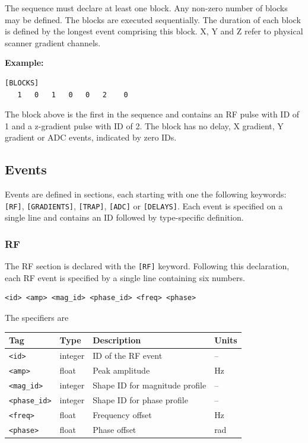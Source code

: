 \documentclass{article}
\begin{document}
\begin{minipage}{\textwidth}
The sequence must declare at least one block. Any non-zero number of blocks may be defined. The blocks are executed sequentially. The duration of each block is defined by the longest event comprising this block. X, Y and Z refer to physical scanner gradient channels.


\textbf{Example:}
\begin{lstlisting}
[BLOCKS]
   1   0   1   0   0   2    0
\end{lstlisting}
\end{minipage}

The block above is the first in the sequence and contains an RF pulse with ID of 1 and a z-gradient pulse with ID of 2. The block has no delay, X gradient, Y gradient or ADC events, indicated by zero IDs.

\subsection{Events}

Events are defined in sections, each starting with one the following keywords: \verb.[RF]., \verb.[GRADIENTS]., \verb.[TRAP]., \verb.[ADC]. or \verb.[DELAYS].. Each event is specified on a single line and contains an ID followed by type-specific definition.

\subsubsection{RF}
The RF section is declared with the \verb.[RF]. keyword. Following this declaration, each RF event is specified by a single line containing six numbers.
\begin{lstlisting}
<id> <amp> <mag_id> <phase_id> <freq> <phase>
\end{lstlisting}

The specifiers are

\begin{tabularx}{\textwidth}{llXl}
\toprule
Tag & Type & Description & Units\\
\midrule
\verb.<id>. & integer & ID of the RF event & -- \\
\verb.<amp>. & float & Peak amplitude & Hz \\
\verb.<mag_id>. & integer & Shape ID for magnitude profile & -- \\
\verb.<phase_id>. & integer & Shape ID for phase profile & --\\
\verb.<freq>. & float & Frequency offset & Hz \\
\verb.<phase>. & float & Phase offset & rad \\
\bottomrule
\end{tabularx}
\end{document}
